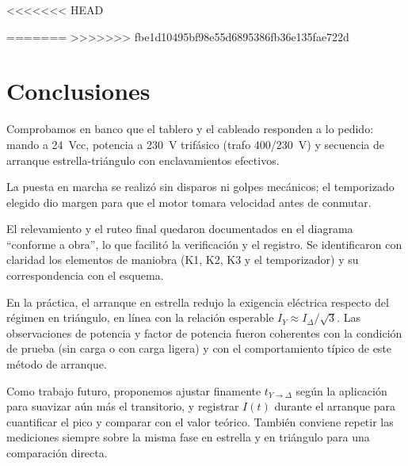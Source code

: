 <<<<<<< HEAD

=======
>>>>>>> fbe1d10495bf98e55d6895386fb36e135fae722d
\section{Conclusiones}
Comprobamos en banco que el tablero y el cableado responden a lo pedido: mando a 24~Vcc, potencia a 230~V trifásico (trafo 400/230~V) y secuencia de arranque estrella-triángulo con enclavamientos efectivos.

La puesta en marcha se realizó sin disparos ni golpes mecánicos; el temporizado elegido dio margen para que el motor tomara velocidad antes de conmutar.

El relevamiento y el ruteo final quedaron documentados en el diagrama ``conforme a obra'', lo que facilitó la verificación y el registro. Se identificaron con claridad los elementos de maniobra (K1, K2, K3 y el temporizador) y su correspondencia con el esquema.

En la práctica, el arranque en estrella redujo la exigencia eléctrica respecto del régimen en triángulo, en línea con la relación esperable $I_Y \approx I_\Delta/\sqrt{3}$. Las observaciones de potencia y factor de potencia fueron coherentes con la condición de prueba (sin carga o con carga ligera) y con el comportamiento típico de este método de arranque.

Como trabajo futuro, proponemos ajustar finamente $t_{Y\to\Delta}$ según la aplicación para suavizar aún más el transitorio, y registrar $I(t)$ durante el arranque para cuantificar el pico y comparar con el valor teórico. También conviene repetir las mediciones siempre sobre la misma fase en estrella y en triángulo para una comparación directa.
